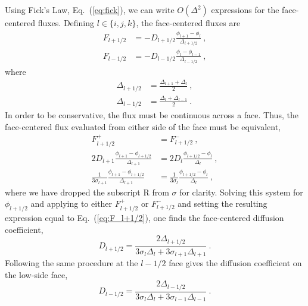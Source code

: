 \documentclass[preprint,12pt]{elsarticle}
\begin{document}
Using Fick's Law, Eq.~(\ref{eq:fick}), we can write $O(\Delta^2)$ expressions
for the face-centered fluxes.  Defining $l\in\{i,j,k\}$, the face-centered
fluxes are
\begin{align}
  F_{l+1/2} &= -D_{l+1/2}\frac{\phi_{l+1} -
    \phi_{l}}{\Delta_{l+1/2}}\:, \label{eq:F_l+1/2}\\ F_{l-1/2} &=
  -D_{l-1/2}\frac{\phi_{l} -
    \phi_{l-1}}{\Delta_{l-1/2}}\:, \label{eq:F_l-1/2}
\end{align}
where
\begin{align}
  \Delta_{l+1/2} &= \frac{\Delta_{l+1} +
    \Delta_{l}}{2}\:,\\ \Delta_{l-1/2} &= \frac{\Delta_{l} +
    \Delta_{l-1}}{2}\:.
\end{align}
In order to be conservative, the flux must be continuous across a face.  Thus,
the face-centered flux evaluated from either side of the face must be
equivalent,
\begin{equation}
  \begin{aligned}
    F_{l+1/2}^{+} &= F_{l+1/2}^{-}\:,\\ 2D_{l+1}\frac{\phi_{l+1} -
      \phi_{l+1/2}}{\Delta_{l+1}} &= 2D_{l}\frac{\phi_{l+1/2} -
      \phi_{l}}{\Delta_l}\:,\\ \frac{1}{3\sigma_{l+1}}\frac{\phi_{l+1}
      - \phi_{l+1/2}}{\Delta_{l+1}} &=
    \frac{1}{3\sigma_{l}}\frac{\phi_{l+1/2} - \phi_{l}}{\Delta_l}\:,
  \end{aligned}
\end{equation}
where we have dropped the subscript $\mathrm{R}$ from $\sigma$ for clarity.
Solving this system for $\phi_{l+1/2}$ and applying to either $F_{l+1/2}^{+}$
or $F_{l+1/2}^{-}$ and setting the resulting expression equal to
Eq.~(\ref{eq:F_l+1/2}), one finds the face-centered diffusion coefficient,
\begin{equation}
  D_{l+1/2} = \frac{2\Delta_{l+1/2}}{3\sigma_l\Delta_l +
    3\sigma_{l+1}\Delta_{l+1}}\:.
  \label{eq:D_l+1/2}
\end{equation}
Following the same procedure at the $l-1/2$ face gives the diffusion
coefficient on the low-side face,
\begin{equation}
  D_{l-1/2} = \frac{2\Delta_{l-1/2}}{3\sigma_l\Delta_l +
    3\sigma_{l-1}\Delta_{l-1}}\:.
  \label{eq:D_l-1/2} 
\end{equation}
\end{document}
